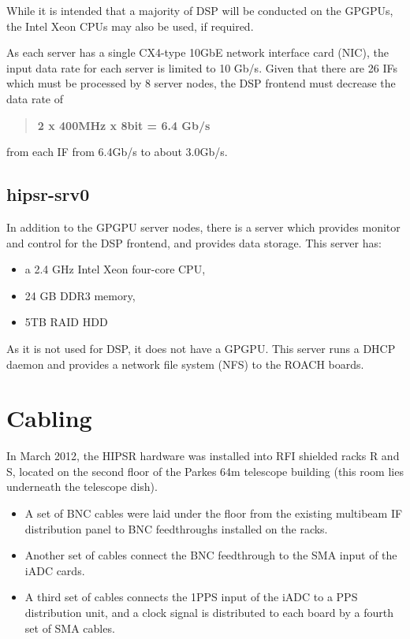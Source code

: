 \documentclass[letterpaper,10pt,english]{sphinxmanual}
\begin{document}
While it is intended that a majority of DSP will be conducted on the GPGPUs, the Intel Xeon CPUs may also be used, if required.

As each server has a single CX4-type 10GbE network interface card (NIC), the input data rate for each server is limited to 10 Gb/s. Given that there are 26 IFs which must be processed by 8 server nodes, the DSP frontend must decrease the data rate of
\begin{quote}

\textbf{2 x 400MHz x 8bit = 6.4 Gb/s}
\end{quote}

from each IF from 6.4Gb/s to about 3.0Gb/s.


\subsection{hipsr-srv0}
\label{hardware:hipsr-srv0}
In addition to the GPGPU server nodes, there is a server which provides monitor and control for the DSP frontend, and provides data storage. This server has:
\begin{itemize}
\item {} 
a 2.4 GHz Intel Xeon four-core CPU,

\item {} 
24 GB DDR3 memory,

\item {} 
5TB RAID HDD

\end{itemize}

As it is not used for DSP, it does not have a GPGPU. This server runs a DHCP daemon and provides a network file system (NFS) to the ROACH boards.


\section{Cabling}
\label{hardware:cabling}
In March 2012, the HIPSR hardware was installed into RFI shielded racks R and S, located on the second floor of the Parkes 64m telescope building (this room lies underneath the telescope dish).
\begin{itemize}
\item {} 
A set of BNC cables were laid under the floor from the existing multibeam IF distribution panel to BNC feedthroughs installed on the racks.

\item {} 
Another set of cables connect the BNC feedthrough to the SMA input of the iADC cards.

\item {} 
A third set of cables connects the 1PPS input of the iADC to a PPS distribution unit, and a clock signal is distributed to each board by a fourth set of SMA cables.

\end{itemize}
\end{document}
